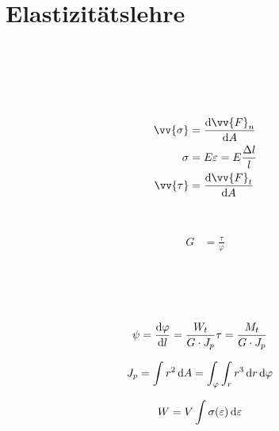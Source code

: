 
\section{Elastizitätslehre}

\begin{boxleft}
\\
\\
\\
\\
\end{boxleft}\begin{boxrightshaded}
\begin{align*}
\vv{\sigma}&=\frac{\diff\vv{F}_n}{\diff A}\\
\sigma&=E \varepsilon=E\frac{\Delta l}{l}\\
\vv{\tau}&= \frac{\diff\vv{F}_t}{\diff A}
\end{align*}
\end{boxrightshaded}

\begin{boxleft}
\\
\end{boxleft}\begin{boxrightshaded}
\begin{align*}
G&=\frac{\tau}{\varphi}
\end{align*}
\end{boxrightshaded}

\begin{boxleft}
\\
\\
\\
\end{boxleft}\begin{boxrightshaded}
\begin{align*}
\psi&=\frac{\mathop{}\!\mathrm{d} \varphi}{\mathop{}\!\mathrm{d} l}=\frac{W_t}{G\cdot J_p}\tau=\frac{M_t}{G\cdot J_p}
\end{align*}
\end{boxrightshaded}

\begin{boxleft}
\end{boxleft}\begin{boxrightshaded}
\begin{align*}
J_p&=\int r^2\mathop{}\!\mathrm{d} A=\int_\varphi\int_r r^3\mathop{}\!\mathrm{d} r \mathop{}\!\mathrm{d} \varphi 
\end{align*}
\end{boxrightshaded}

\begin{boxleft}
\end{boxleft}\begin{boxrightshaded}
\begin{align*}
W&=V\int \sigma(\varepsilon) \mathop{}\!\mathrm{d} \varepsilon 
\end{align*}
\end{boxrightshaded}
